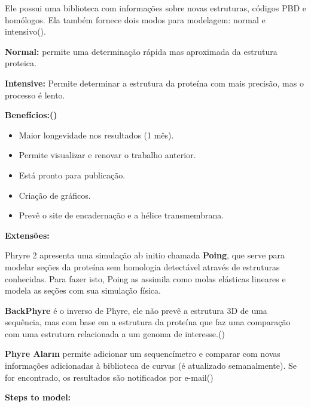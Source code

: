 \documentclass[11pt, letterpaper, portuguese]{article}
\begin{document}
        \par{Ele possui uma biblioteca com informações sobre novas estruturas, códigos PBD e homólogos. Ela também fornece dois modos para modelagem: normal e intensivo().}
            \par{\textbf{Normal:} permite uma determinação rápida mas aproximada da estrutura proteica.}
            \par{\textbf{Intensive:} Permite determinar a estrutura da proteína com mais precisão, mas o processo é lento.}
        \par{\textbf{Benefícios:()}}
        \begin{itemize}
            \item Maior longevidade nos resultados (1 mês).
            \item  Permite visualizar e renovar o trabalho anterior.
            \item Está pronto para publicação.
            \item Criação de gráficos.
            \item Prevê o site de encadernação e a hélice transmembrana.
        \end{itemize}
        \par{\textbf{Extensões:}}
        \par{Phryre 2 apresenta uma simulação ab initio chamada \textbf{Poing}, que serve para modelar seções da proteína sem homologia detectável através de estruturas conhecidas. Para fazer isto, Poing as assimila como molas elásticas lineares e modela as seções com sua simulação física.}
        \par{\textbf{BackPhyre} é o inverso de Phyre, ele não prevê a estrutura 3D de uma sequência, mas com base em a estrutura da proteína que faz uma comparação com uma estrutura relacionada a um genoma de interesse.()}
        \par{\textbf{Phyre Alarm} permite adicionar um sequencímetro e comparar com novas informações adicionadas à biblioteca de curvas (é atualizado semanalmente). Se for encontrado, os resultados são notificados por e-mail()}
        \par{\textbf{Steps to model:}}
\end{document}
